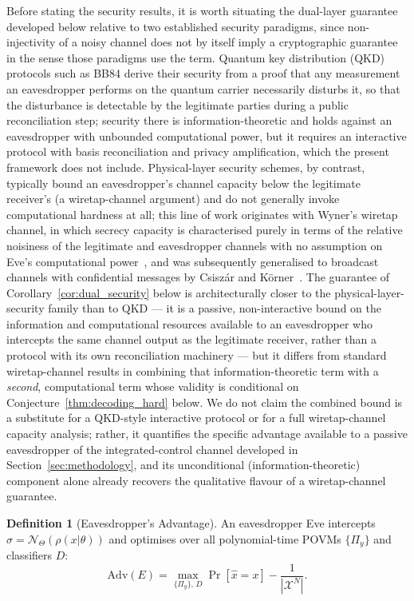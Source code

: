 \documentclass[journal,twocolumn]{IEEEtran}
\theoremstyle{definition}
\newtheorem{definition}{Definition}[section]
\theoremstyle{plain}
\begin{document}
Before stating the security results, it is worth situating the
dual-layer guarantee developed below relative to two established
security paradigms, since non-injectivity of a noisy channel does
not by itself imply a cryptographic guarantee in the sense those
paradigms use the term. Quantum key distribution (QKD) protocols
such as BB84 derive their security from a proof that any measurement
an eavesdropper performs on the quantum carrier necessarily disturbs
it, so that the disturbance is detectable by the legitimate parties
during a public reconciliation step; security there is
information-theoretic and holds against an eavesdropper with
unbounded computational power, but it requires an interactive
protocol with basis reconciliation and privacy amplification, which
the present framework does not include. Physical-layer security
schemes, by contrast, typically bound an eavesdropper's channel
capacity below the legitimate receiver's (a wiretap-channel
argument) and do not generally invoke computational hardness at all;
this line of work originates with Wyner's wiretap channel, in which
secrecy capacity is characterised purely in terms of the relative
noisiness of the legitimate and eavesdropper channels with no
assumption on Eve's computational power~\cite{wyner1975}, and was
subsequently generalised to broadcast channels with confidential
messages by Csisz\'{a}r and K\"{o}rner~\cite{csiszarkorner1978}.
The guarantee of Corollary~\ref{cor:dual_security} below is
architecturally closer to the physical-layer-security family than to
QKD --- it is a passive, non-interactive bound on the information
and computational resources available to an eavesdropper who
intercepts the same channel output as the legitimate receiver,
rather than a protocol with its own reconciliation machinery --- but
it differs from standard wiretap-channel results in combining that
information-theoretic term with a \emph{second}, computational term
whose validity is conditional on Conjecture~\ref{thm:decoding_hard}
below. We do not claim the combined bound is a substitute for a
QKD-style interactive protocol or for a full wiretap-channel capacity
analysis; rather, it quantifies the specific advantage available to
a passive eavesdropper of the integrated-control channel developed
in Section~\ref{sec:methodology}, and its unconditional
(information-theoretic) component alone already recovers the
qualitative flavour of a wiretap-channel guarantee.

\begin{definition}[Eavesdropper's Advantage]
\label{def:adv}
An eavesdropper Eve intercepts $\sigma = \mathcal{N}_\Theta(\rho(x|\theta))$
and optimises over all polynomial-time POVMs $\{\Pi_y\}$ and
classifiers $D$:
\begin{equation}
  \mathrm{Adv}(E) = \max_{\{\Pi_y\},\,D}
  \Pr[\hat x = x] - \frac{1}{|\mathcal{X}^N|}.
  \label{eq:adv_def}
\end{equation}
\end{definition}
\end{document}
